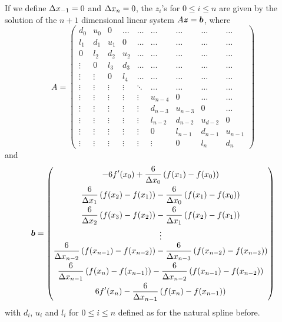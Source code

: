If we define $\Delta{x_{-1}} = 0$ and $\Delta{x_n} = 0$,
the $z_i$'s for $0\leq i \leq n$ are given by the solution of the
$n+1$ dimensional linear system $A \bm{z} = \bm{b}$,
where
\begin{equation} \label{ccs1}
A = \left( \begin{array}{ccccccccc}
d_0  & u_0 & 0 & \ldots & \ldots & \ldots & \ldots & \ldots & \ldots \\ 
l_1 & d_1  & u_1 & 0 & \ldots & \ldots & \ldots & \ldots & \ldots \\ 
0 & l_2 & d_2 & u_2 & \ldots & \ldots & \ldots & \ldots & \ldots \\ 
\vdots & 0 & l_3 & d_3 & \ldots & \ldots & \ldots & \ldots & \ldots \\ 
\vdots & \vdots & 0 & l_4 & \ldots & \ldots & \ldots & \ldots & \ldots \\ 
\vdots & \vdots & \vdots & \vdots & \ddots & \ldots & \ldots &
\ldots & \ldots \\ 
\vdots & \vdots & \vdots & \vdots & \vdots & u_{n-4} & 0 & \ldots & \ldots \\ 
\vdots & \vdots & \vdots & \vdots & \vdots & d_{n-3} &  u_{n-3} & 0 & \ldots \\ 
\vdots & \vdots & \vdots & \vdots & \vdots & l_{n-2} &  d_{n-2} & u_{d-2} & 0 \\ 
\vdots & \vdots & \vdots & \vdots & \vdots & 0 & l_{n-1} & d_{n-1} & u_{n-1} \\
\vdots & \vdots & \vdots & \vdots & \vdots & \vdots & 0 & l_n & d_n 
\end{array} \right)
\end{equation}
and
\[
\bm{b} = \begin{pmatrix}
\displaystyle - 6f'(x_0) + \frac{6}{\Delta{x_0}}\left(f(x_1)-f(x_0)\right)
\\[0.8em]
\displaystyle \frac{6}{\Delta{x_1}}\left(f(x_2) -f(x_1) \right)
- \frac{6}{\Delta{x_0}} \left(f(x_1) - f(x_0) \right) \\[0.8em]
\displaystyle \frac{6}{\Delta{x_2}}\left(f(x_3) -f(x_2) \right)
- \frac{6}{\Delta{x_1}} \left(f(x_2) - f(x_1) \right) \\[0.8em]
\vdots \\
\displaystyle \frac{6}{\Delta{x_{n-2}}}\left(f(x_{n-1}) -f(x_{n-2}) \right)
- \frac{6}{\Delta{x_{n-3}}} \left(f(x_{n-2}) - f(x_{n-3}) \right) \\[0.8em]
\displaystyle \frac{6}{\Delta{x_{n-1}}}\left(f(x_n) -f(x_{n-1}) \right)
- \frac{6}{\Delta{x_{n-2}}} \left(f(x_{n-1}) - f(x_{n-2}) \right) \\[0.8em]
\displaystyle 6f'(x_n) - \frac{6}{\Delta{x_{n-1}}}\left(f(x_n)-f(x_{n-1})\right)
\end{pmatrix}
\]
with $d_i$, $u_i$ and $l_i$ for $0 \leq i \leq n$ defined as for
the natural spline before.

